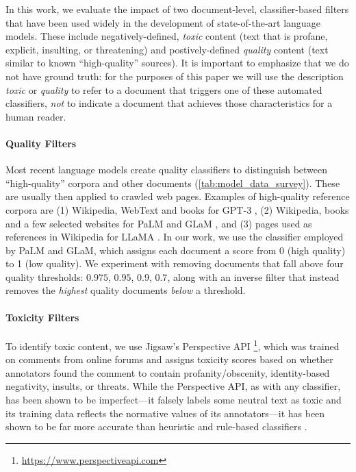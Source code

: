 \documentclass{article}
\begin{document}
In this work, we evaluate the impact of two document-level, classifier-based  filters that have been used widely in the development of state-of-the-art language models.
These include negatively-defined, \textit{toxic} content (text that is profane, explicit, insulting, or threatening) and postively-defined \textit{quality} content (text similar to known ``high-quality'' sources).
It is important to emphasize that we do not have ground truth: for the purposes of this paper we will use the description \textit{toxic} or \textit{quality} to refer to a document that triggers one of these automated classifiers, \textit{not} to indicate a document that achieves those characteristics for a human reader.

\vspace{-3mm}
\paragraph{Quality Filters}
Most recent language models create quality classifiers to distinguish between %
``high-quality'' corpora and other documents (\cref{tab:model_data_survey}).
These are usually then applied to crawled web pages.
Examples of high-quality reference corpora are (1) Wikipedia, WebText and books for GPT-3 \citep{brown2020language}, (2) Wikipedia, books and a few selected websites for PaLM \citep{chowdhery2022palm} and GLaM \citep{du_glam_2021},
and (3) pages used as references in Wikipedia for LLaMA \citep{touvron2023llama}.
In our work, we use the classifier employed by PaLM and GLaM, which assigns each document a score from 0 (high quality) to 1 (low quality).
We experiment with removing documents that fall above four quality thresholds: $0.975$, $0.95$, $0.9$, $0.7$, along with an inverse filter that instead removes the \textit{highest} quality documents \emph{below} a threshold.

\vspace{-3mm}
\paragraph{Toxicity Filters}
To identify toxic content, we use Jigsaw's Perspective API \footnote{\url{https://www.perspectiveapi.com}}, which was trained on comments from online forums and assigns toxicity scores based on whether annotators found the comment to contain profanity/obscenity, identity-based negativity, insults, or threats.
While the Perspective API, as with any classifier, has been shown to be imperfect---it falsely labels some neutral text as toxic and its training data reflects the normative values of its annotators---it has been shown to be far more accurate than heuristic and rule-based classifiers \citep{friedl2023dis,gargee2022analyzing,lees2022perspective}.
\end{document}
